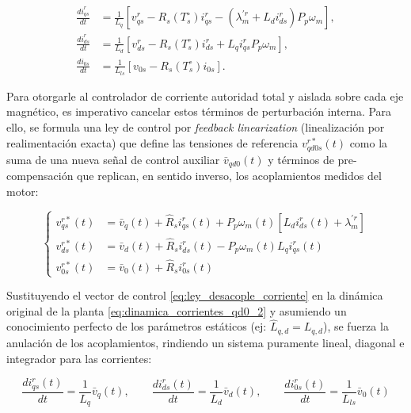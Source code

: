 \documentclass[10pt,a4paper]{article}
\begin{document}
\begin{equation}
	\begin{aligned}
		\frac{di_{qs}^{r}}{dt} &= \frac{1}{L_q}\left[v_{qs}^{r} - R_s\left(T_s^{\circ}\right)i_{qs}^{r} - \left(\lambda_m^{\prime r}+L_d i_{ds}^{r}\right)P_p\omega_m\right],\\
		\frac{di_{ds}^{r}}{dt} &= \frac{1}{L_d}\left[v_{ds}^{r} - R_s\left(T_s^{\circ}\right)i_{ds}^{r} + L_q i_{qs}^{r}P_p\omega_m\right],\\
		\frac{di_{0s}}{dt} &= \frac{1}{L_{ls}}\left[v_{0s} - R_s\left(T_s^{\circ}\right)i_{0s}\right].
	\end{aligned}
	\label{eq:dinamica_corrientes_qd0_2}
\end{equation}

Para otorgarle al controlador de corriente autoridad total y aislada sobre cada eje magnético, es imperativo cancelar estos términos de perturbación interna. 
Para ello, se formula una ley de control por \textit{feedback linearization} (linealización por realimentación exacta) que define las tensiones de referencia $v_{qd0s}^{r*}(t)$ como la suma de una nueva señal de control auxiliar $\bar{v}_{qd0}(t)$ y términos de pre-compensación que replican, en sentido inverso, los acoplamientos medidos del motor:

\begin{equation}
	\left\{
	\begin{aligned}
		v_{qs}^{r*}(t) &= \bar{v}_q(t) + \hat{R}_s i_{qs}^r(t) + P_p \omega_m(t) \left[ L_d i_{ds}^r(t) + \lambda_m^{\prime r} \right] \\[2mm]
		v_{ds}^{r*}(t) &= \bar{v}_d(t) + \hat{R}_s i_{ds}^r(t) - P_p \omega_m(t) L_q i_{qs}^r(t) \\[2mm]
		v_{0s}^{r*}(t) &= \bar{v}_0(t) + \hat{R}_s i_{0s}^r(t)
	\end{aligned}
	\right.
	\label{eq:ley_desacople_corriente}
\end{equation}

Sustituyendo el vector de control \eqref{eq:ley_desacople_corriente} en la dinámica original de la planta \eqref{eq:dinamica_corrientes_qd0_2} y asumiendo un conocimiento perfecto de los parámetros estáticos (ej: $\hat{L}_{q,d} = L_{q,d}$), se fuerza la anulación de los acoplamientos, rindiendo un sistema puramente lineal, diagonal e integrador para las corrientes:

\begin{equation}
	\frac{di_{qs}^r(t)}{dt} = \frac{1}{L_q} \bar{v}_q(t), \qquad 
	\frac{di_{ds}^r(t)}{dt} = \frac{1}{L_d} \bar{v}_d(t), \qquad 
	\frac{di_{0s}^r(t)}{dt} = \frac{1}{L_{ls}} \bar{v}_0(t)
	\label{eq:corrientes_desacopladas_integradores}
\end{equation}
\end{document}
